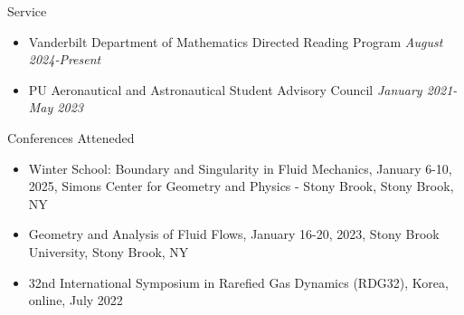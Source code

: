 \documentclass{CV} %
\begin{document}
\begin{rSection}{Service}
    \begin{itemize}
        \item Vanderbilt Department of Mathematics Directed Reading Program \hfill \textit{August 2024-Present}
        \item PU Aeronautical and Astronautical Student Advisory Council \hfill \textit{January 2021-May 2023}
    \end{itemize}
    
\end{rSection}


\begin{rSection}{Conferences Atteneded}
    \begin{itemize}
        \item Winter School: Boundary and Singularity in Fluid Mechanics, January 6-10, 2025, Simons Center for Geometry and Physics - Stony Brook, Stony Brook, NY
        \item Geometry and Analysis of Fluid Flows, January 16-20, 2023, Stony Brook University, Stony Brook, NY
        \item 32nd International Symposium in Rarefied Gas Dynamics (RDG32), Korea, online, July 2022 
    \end{itemize}
    
\end{rSection}
\end{document}
